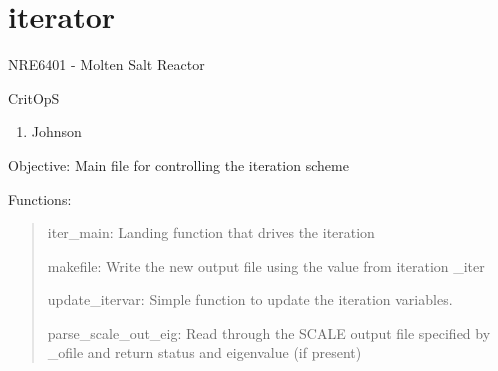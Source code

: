 \documentclass[letterpaper,10pt,english]{sphinxmanual}
\begin{document}
\chapter{iterator}
\label{\detokenize{iterator::doc}}\label{\detokenize{iterator:module-critops.iterator}}\label{\detokenize{iterator:iterator}}
NRE6401 - Molten Salt Reactor

CritOpS
\begin{enumerate}
\item {} 
Johnson

\end{enumerate}

Objective: Main file for controlling the iteration scheme

Functions:
\begin{quote}

iter\_main: Landing function that drives the iteration

makefile: Write the new output file using the value from iteration \_iter

update\_itervar: Simple function to update the iteration variables.

parse\_scale\_out\_eig: Read through the SCALE output file specified by \_ofile and return status and eigenvalue (if present)
\end{quote}
\end{document}
